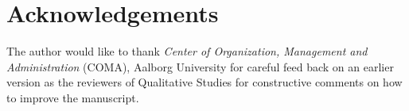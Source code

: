 \section{Acknowledgements}
\label{paper3:acknowledgements}

The author would like to thank \textit{Center of Organization, Management and Administration} (COMA), Aalborg University for careful feed back on an earlier version as the reviewers of Qualitative Studies for constructive comments on how to improve the manuscript.